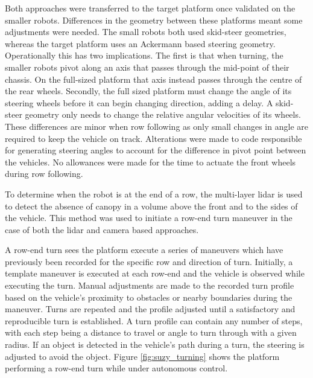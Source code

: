 \documentclass[preprint,authoryear,12pt]{elsarticle}
\begin{document}
    Both approaches were transferred to the target platform once validated on the smaller robots.
    Differences in the geometry between these platforms meant some adjustments were needed.
    The small robots both used skid-steer geometries, whereas the target platform uses an Ackermann based steering geometry.
    Operationally this has two implications.
    The first is that when turning, the smaller robots pivot along an axis that passes through the mid-point of their chassis.
    On the full-sized platform that axis instead passes through the centre of the rear wheels.
    Secondly, the full sized platform must change the angle of its steering wheels before it can begin changing direction, adding a delay.
    A skid-steer geometry only needs to change the relative angular velocities of its wheels.
    These differences are minor when row following as only small changes in angle are required to keep the vehicle on track.
    Alterations were made to code responsible for generating steering angles to account for the difference in pivot point between the vehicles.
    No allowances were made for the time to actuate the front wheels during row following.

    To determine when the robot is at the end of a row, the multi-layer lidar is used to detect the absence of canopy in a volume above the front and to the sides of the vehicle.
    This method was used to initiate a row-end turn maneuver in the case of both the lidar and camera based approaches.

    A row-end turn sees the platform execute a series of maneuvers which have previously been recorded for the specific row and direction of turn.
    Initially, a template maneuver is executed at each row-end and the vehicle is observed while executing the turn.
    Manual adjustments are made to the recorded turn profile based on the vehicle's proximity to obstacles or nearby boundaries during the maneuver.
    Turns are repeated and the profile adjusted until a satisfactory and reproducible turn is established.
    A turn profile can contain any number of steps, with each step being a distance to travel or angle to turn through with a given radius.
    If an object is detected in the vehicle's path during a turn, the steering is adjusted to avoid the object.
    Figure \ref{fig:suzy_turning} shows the platform performing a row-end turn while under autonomous control.
\end{document}

